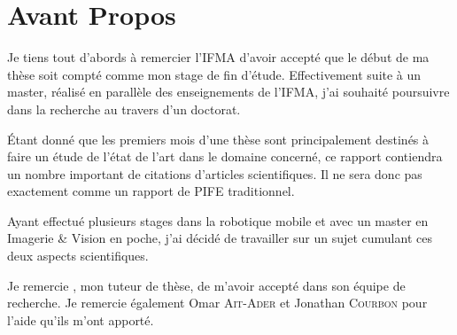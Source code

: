 \section*{Avant Propos}

Je tiens tout d'abords à remercier l'IFMA d'avoir accepté que le début de ma thèse soit compté comme mon stage de fin d'étude.
Effectivement suite à un master, réalisé en parallèle des enseignements de l'IFMA, j'ai souhaité poursuivre dans la recherche au travers d'un doctorat.

\'Etant donné que les premiers mois d'une thèse sont principalement destinés à faire un étude de l'état de l'art dans le domaine concerné, ce rapport contiendra un nombre important de citations d'articles scientifiques. Il ne sera donc pas exactement comme un rapport de PIFE traditionnel.

Ayant effectué plusieurs stages dans la robotique mobile et avec un master en Imagerie \& Vision en poche, j'ai décidé de travailler sur un sujet cumulant ces deux aspects scientifiques.

Je remercie \tuteur, mon tuteur de thèse, de m'avoir accepté dans son équipe de recherche. Je remercie également Omar \textsc{Ait-Ader} et Jonathan \textsc{Courbon} pour l'aide qu'ils m'ont apporté.